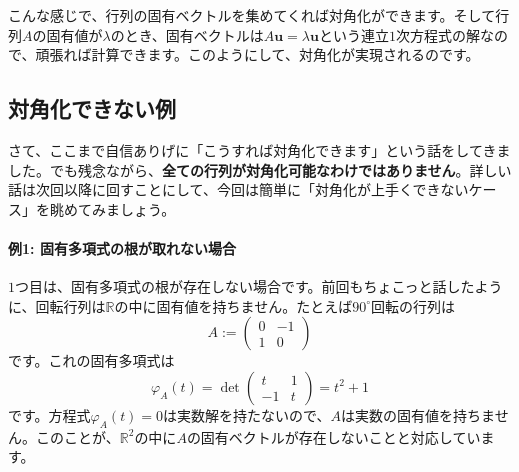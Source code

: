 こんな感じで、行列の固有ベクトルを集めてくれば対角化ができます。そして行列$A$の固有値が$\lambda$のとき、固有ベクトルは$A\bm{u} = \lambda \bm{u}$という連立$1$次方程式の解なので、頑張れば計算できます。このようにして、対角化が実現されるのです。

\subsection{対角化できない例}

さて、ここまで自信ありげに「こうすれば対角化できます」という話をしてきました。でも残念ながら、\textbf{全ての行列が対角化可能なわけではありません}。詳しい話は次回以降に回すことにして、今回は簡単に「対角化が上手くできないケース」を眺めてみましょう。

\paragraph{例1: 固有多項式の根が取れない場合}

$1$つ目は、固有多項式の根が存在しない場合です。前回もちょこっと話したように、回転行列は$\mathbb{R}$の中に固有値を持ちません。たとえば$90^{\circ}$回転の行列は
\[
A :=
\begin{pmatrix}
0 & -1 \\
1 & 0
\end{pmatrix}
\]
です。これの固有多項式は
\[
\varphi_A(t) =
\det
\begin{pmatrix}
t & 1 \\
-1 & t
\end{pmatrix}
= t^2 + 1
\]
です。方程式$\varphi_A(t) = 0$は実数解を持たないので、$A$は実数の固有値を持ちません。このことが、$\mathbb{R}^2$の中に$A$の固有ベクトルが存在しないことと対応しています。

